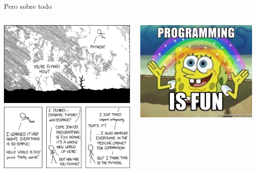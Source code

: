 \documentclass[bigger,unknownkeysallowed]{beamer}
\begin{document}
\begin{frame}[label={sec:org43895cc}]{Pero sobre todo}
\begin{columns}
\begin{column}{0.5\columnwidth}
\begin{center}
\includegraphics[width=.9\linewidth]{flying_joke.png}
\end{center}
\end{column}

\begin{column}{0.5\columnwidth}
\begin{center}
\includegraphics[width=.9\linewidth]{isfun.jpg}
\end{center}
\end{column}
\end{columns}
\end{frame}
\end{document}
